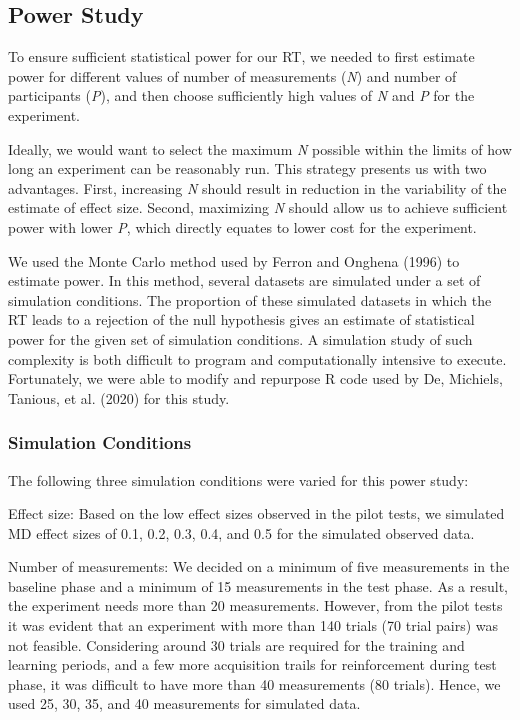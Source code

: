 \documentclass{article}
\begin{document}
\subsection{Power Study}

To ensure sufficient statistical power for our RT, we needed to first estimate power for different values of number of measurements (\emph{N}) and number of participants (\emph{P}), and then choose sufficiently high values of \emph{N} and \emph{P} for the experiment. 

Ideally, we would want to select the maximum \emph{N} possible within the limits of how long an experiment can be reasonably run. This strategy presents us with two advantages. First, increasing \emph{N} should result in reduction in the variability of the estimate of effect size. Second, maximizing \emph{N} should allow us to achieve sufficient power with lower \emph{P}, which directly equates to lower cost for the experiment.

We used the Monte Carlo method used by Ferron and Onghena (1996) to estimate power. In this method, several datasets are simulated under a set of simulation conditions. The proportion of these simulated datasets in which the RT leads to a rejection of the null hypothesis gives an estimate of statistical power for the given set of simulation conditions. A simulation study of such complexity is both difficult to program and computationally intensive to execute. Fortunately, we were able to modify and repurpose R code used by De, Michiels, Tanious, et al. (2020) for this study. 

\subsubsection{Simulation Conditions}

The following three simulation conditions were varied for this power study:

Effect size: Based on the low effect sizes observed in the pilot tests, we simulated MD effect sizes of 0.1, 0.2, 0.3, 0.4, and 0.5 for the simulated observed data.

Number of measurements: We decided on a minimum of five measurements in the baseline phase and a minimum of 15 measurements in the test phase. As a result, the experiment needs more than 20 measurements. However, from the pilot tests it was evident that an experiment with more than 140 trials (70 trial pairs) was not feasible. Considering around 30 trials are required for the training and learning periods, and a few more acquisition trails for reinforcement during test phase, it was difficult to have more than 40 measurements (80 trials). Hence, we used 25, 30, 35, and 40 measurements for simulated data. 
\end{document}
